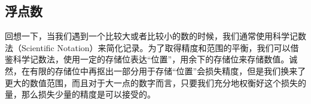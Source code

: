     \subsection{浮点数}\label{subsec:NumberSystemBasics/fixed-point-and-floating-point/floating-point}
        回想一下，当我们遇到一个比较大或者比较小的数的时候，我们通常使用科学记数法（Scientific Notation）来简化记录。为了取得精度和范围的平衡，我们可以借鉴科学记数法，使用一定的存储位表达“位置”，用余下的存储位来存储数值。诚然，在有限的存储位中再抠出一部分用于存储“位置”会损失精度，但是我们换来了更大的数值范围，而且对于大一点的数字而言，只要我们充分地权衡好这个损失的量，那么损失少量的精度是可以接受的。
